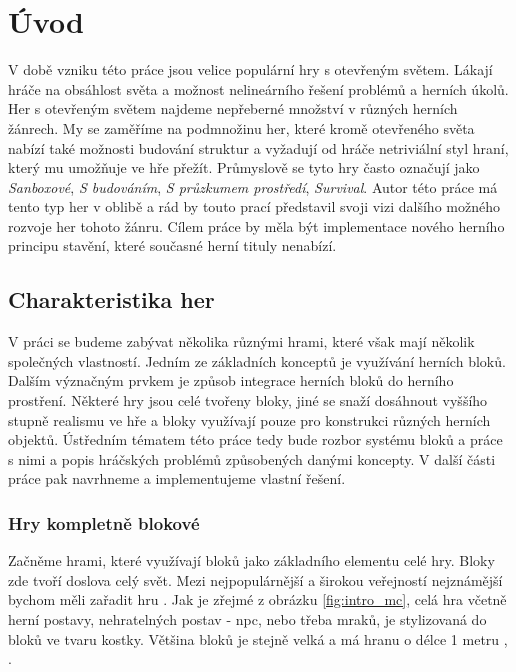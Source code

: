 
\chapter{Úvod}

V době vzniku této práce jsou velice populární hry s otevřeným světem. Lákají hráče na obsáhlost světa a možnost nelineárního řešení problémů a herních úkolů. Her s otevřeným světem najdeme nepřeberné množství v různých herních žánrech. My se zaměříme na podmnožinu her, které kromě otevřeného světa nabízí také možnosti budování struktur a vyžadují od hráče netriviální styl hraní, který mu umožňuje ve hře přežít. Průmyslově se tyto hry často označují jako \textit{Sanboxové}, \textit{S budováním}, \textit{S průzkumem prostředí}, \textit{Survival}. Autor této práce má tento typ her v oblibě a rád by touto prací představil svoji vizi dalšího možného rozvoje her tohoto žánru. Cílem práce by měla být implementace nového herního principu stavění, které současné herní tituly nenabízí.

\section{Charakteristika her}
V práci se budeme zabývat několika různými hrami, které však mají několik společných vlastností. Jedním ze základních konceptů je využívání herních bloků. Dalším význačným prvkem je způsob integrace herních bloků do herního prostření. Některé hry jsou celé tvořeny bloky, jiné se snaží dosáhnout vyššího stupně realismu ve hře a bloky využívají pouze pro konstrukci různých herních objektů. Ústředním tématem této práce tedy bude rozbor systému bloků a práce s nimi a popis hráčských problémů způsobených danými koncepty. V další části práce pak navrhneme a implementujeme vlastní řešení.




\subsection{Hry kompletně blokové}
Začněme hrami, které využívají bloků jako základního elementu celé hry. Bloky zde tvoří doslova celý svět. Mezi nejpopulárnější a širokou veřejností nejznámější bychom měli zařadit hru \MC{}. Jak je zřejmé z obrázku \ref{fig:intro_mc}, celá hra včetně herní postavy, nehratelných postav - \gls{npc}, nebo třeba mraků, je stylizovaná do bloků ve tvaru kostky. Většina bloků je stejně velká a má hranu o délce 1 metru \citep{mc_block}, \citep{mc_units}. 

